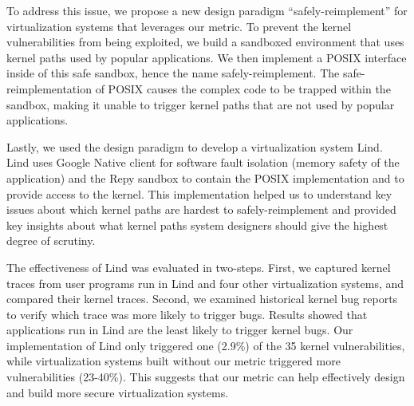 To address this issue, we propose a new design paradigm
“safely-reimplement” for virtualization systems that leverages our metric.
To prevent the kernel vulnerabilities from being exploited, we build a
sandboxed environment that uses kernel paths used by popular applications.
We then implement a POSIX interface inside of this safe sandbox, hence the
name safely-reimplement. The safe-reimplementation of POSIX causes the
complex code to be trapped within the sandbox, making it unable to trigger
kernel paths that are not used by popular applications.

Lastly, we used the design paradigm to develop a virtualization system
Lind.  Lind uses Google Native client for software fault isolation (memory
safety of the application) and the Repy sandbox to contain the POSIX
implementation and to provide access to the kernel.  This implementation
helped us to understand key issues about which kernel paths are hardest to
safely-reimplement and provided key insights about what kernel paths system
designers should give the highest degree of scrutiny.

The effectiveness of Lind was evaluated in two-steps. First, we captured
kernel traces from user programs run in Lind and four other virtualization
systems, and compared their kernel traces. Second, we examined historical
kernel bug reports to verify which trace was more likely to trigger bugs.
Results showed that applications run in Lind are the least likely to
trigger kernel bugs. Our implementation of Lind only triggered one (2.9\%)
of the 35 kernel vulnerabilities, while virtualization systems built
without our metric triggered more vulnerabilities (23-40\%). This
suggests that our metric can help effectively design and build more secure
virtualization systems.

